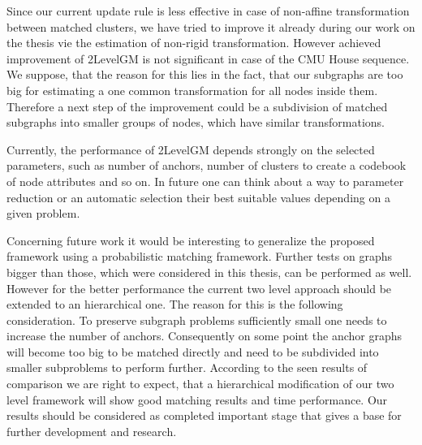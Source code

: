 Since our current update rule is less effective in case of non-affine transformation between matched clusters, we have tried to improve it already during our work on the thesis vie the estimation of non-rigid transformation. However achieved improvement of 2LevelGM is not significant in case of the CMU House sequence. We suppose, that the reason for this lies in the fact, that our subgraphs are too big for estimating a one common transformation for all nodes inside them. Therefore a next step of the improvement could be a subdivision of matched subgraphs into smaller groups of nodes, which have similar transformations.

Currently, the performance of 2LevelGM depends strongly on the selected parameters, such as number of anchors, number of clusters to create a codebook of node attributes and so on. In future one can think about a way to parameter reduction or an automatic selection their best suitable values depending on a given problem. %

Concerning future work it would be interesting to generalize the proposed framework using a probabilistic matching framework. Further tests on graphs bigger than those, which were considered in this thesis, can be performed as well. However for the better performance the current two level approach should be extended to an hierarchical one. The reason for this is the following consideration. To preserve subgraph problems sufficiently small one needs to increase the number of anchors. Consequently on some point the anchor graphs will become too big to be matched directly and need to be subdivided into smaller subproblems to perform further. According to the seen results of comparison we are right to expect, that a hierarchical modification of our two level framework will show good matching results and time performance. 
Our results should be considered as completed important stage that gives a base for further development and research.

 
